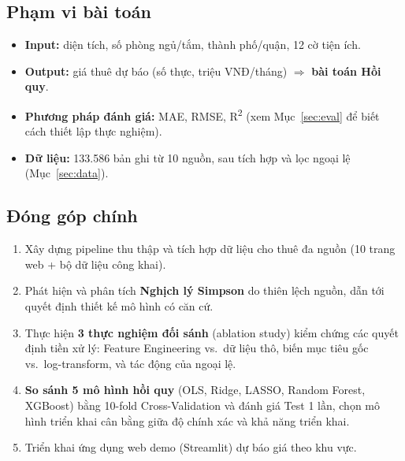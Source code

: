 \subsection{Phạm vi bài toán}

\begin{itemize}[leftmargin=*, itemsep=3pt]
  \item \textbf{Input:} diện tích, số phòng ngủ/tắm, thành phố/quận, 12 cờ tiện ích.
  \item \textbf{Output:} giá thuê dự báo (số thực, triệu VNĐ/tháng)
        $\Rightarrow$ \textbf{bài toán Hồi quy}.
  \item \textbf{Phương pháp đánh giá:} MAE, RMSE, R\textsuperscript{2}
        (xem Mục~\ref{sec:eval} để biết cách thiết lập thực nghiệm).
  \item \textbf{Dữ liệu:} 133.586 bản ghi từ 10 nguồn, sau tích hợp và lọc ngoại lệ
        (Mục~\ref{sec:data}).
\end{itemize}

\subsection{Đóng góp chính}

\begin{enumerate}[leftmargin=*, itemsep=3pt]
  \item Xây dựng pipeline thu thập và tích hợp dữ liệu cho thuê đa nguồn
        (10 trang web + bộ dữ liệu công khai).
  \item Phát hiện và phân tích \textbf{Nghịch lý Simpson} do thiên lệch nguồn,
        dẫn tới quyết định thiết kế mô hình có căn cứ.
  \item Thực hiện \textbf{3 thực nghiệm đối sánh} (ablation study) kiểm chứng
        các quyết định tiền xử lý: Feature Engineering vs.\ dữ liệu thô,
        biến mục tiêu gốc vs.\ log-transform, và tác động của ngoại lệ.
  \item \textbf{So sánh 5 mô hình hồi quy} (OLS, Ridge, LASSO, Random Forest, XGBoost)
        bằng 10-fold Cross-Validation và đánh giá Test 1 lần, chọn mô hình triển khai
        cân bằng giữa độ chính xác và khả năng triển khai.
  \item Triển khai ứng dụng web demo (Streamlit) dự báo giá theo khu vực.
\end{enumerate}
